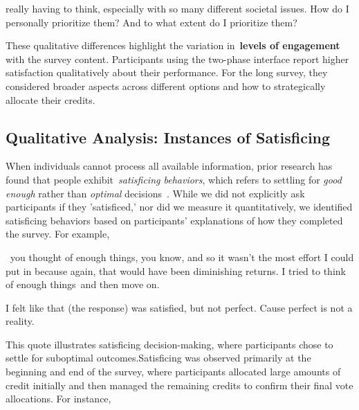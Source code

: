 \begin{displayquote}
\bracketellipsis really having to think, especially with so many different societal issues. How do I personally prioritize them? And to what extent do I prioritize them? \hfill{}
\end{displayquote}

These qualitative differences highlight the variation in~\textbf{levels of engagement} with the survey content. Participants using the two-phase interface report higher satisfaction qualitatively about their performance. For the long survey, they considered broader aspects across different options and how to strategically allocate their credits. 

\subsection{Qualitative Analysis: Instances of Satisficing}
\label{sec:satisficing}
When individuals cannot process all available information, prior research has found that people exhibit~\textit{satisficing behaviors}, which refers to settling for \textit{good enough} rather than \textit{optimal} decisions~\cite{gigerenzerReasoningFastFrugal1996}. While we did not explicitly ask participants if they 'satisficed,' nor did we measure it quantitatively, we identified satisficing behaviors based on participants' explanations of how they completed the survey. For example, 

\begin{displayquote}
    ~\bracketellipsis you thought of enough things, you know, and so it wasn't the most effort I could put in because again, that would have been diminishing returns. I tried to think of enough things~\bracketellipsis and then move on.~\bracketellipsis  \hfill{}
    
    I felt like that (the response) was satisfied, but not perfect. Cause perfect is not a reality. \hfill{}
\end{displayquote}

This quote illustrates satisficing decision-making, where participants chose to settle for suboptimal outcomes.Satisficing was observed primarily at the beginning and end of the survey, where participants allocated large amounts of credit initially and then managed the remaining credits to confirm their final vote allocations. For instance, 

